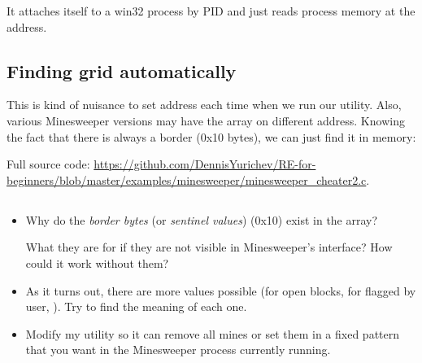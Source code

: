 It attaches itself to a win32 process by \ac{PID} and just reads process memory at the address.

\subsection{Finding grid automatically}

This is kind of nuisance to set address each time when we run our utility.
Also, various Minesweeper versions may have the array on different address.
Knowing the fact that there is always a border (0x10 bytes), we can just find it in memory:



Full source code: \url{https://github.com/DennisYurichev/RE-for-beginners/blob/master/examples/minesweeper/minesweeper_cheater2.c}.

\subsection{\Exercises}

\begin{itemize}

\item 
Why do the \emph{border bytes} (or \emph{sentinel values}) (0x10) exist in the array?

What they are for if they are not visible in Minesweeper's interface?
How could it work without them?

\item 
As it turns out, there are more values possible (for open blocks, for flagged by user, \etc{}).
Try to find the meaning of each one.

\item 
Modify my utility so it can remove all mines or set them in a fixed pattern that you want in the Minesweeper
process currently running.

\end{itemize}
